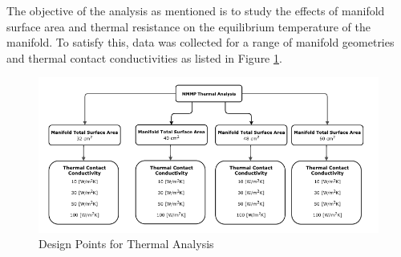 \documentclass[journal]{new-aiaa}
\begin{document}
The objective of the analysis as mentioned is to study the effects of manifold surface area and thermal resistance on the equilibrium temperature of the manifold. To satisfy this, data was collected for a range of manifold geometries and thermal contact conductivities as listed in Figure \ref{dp}.
\begin{figure}[hbt!]
\centering
\includegraphics[width=.9\textwidth]{DesignPoints.png}
\caption{Design Points for Thermal Analysis}
\label{dp}
\end{figure}
\end{document}
